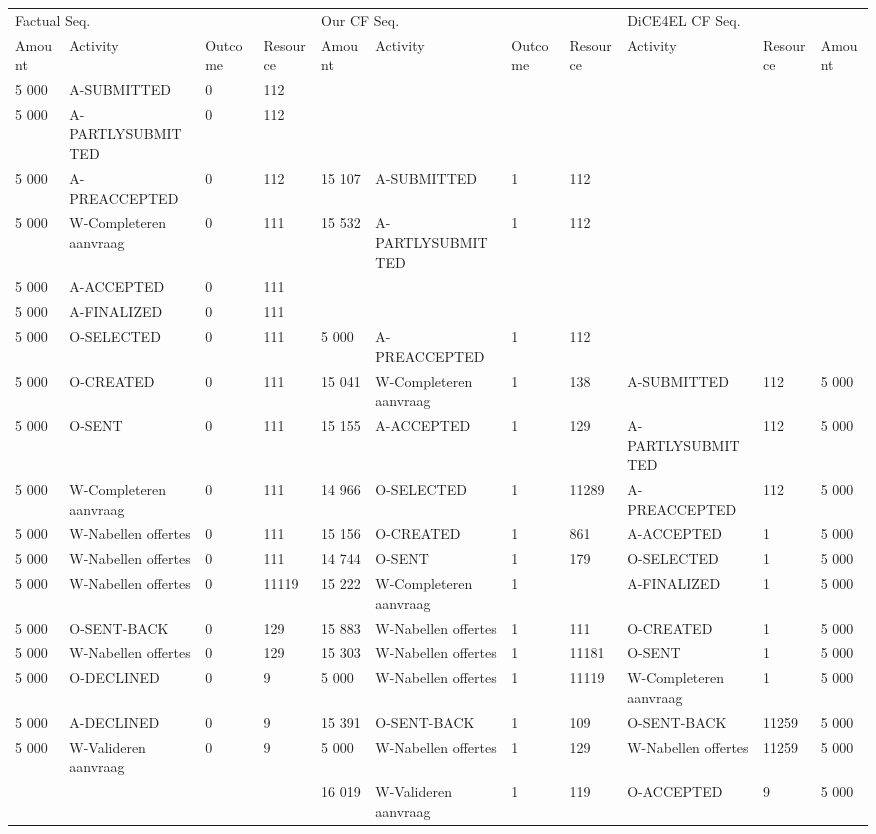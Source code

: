 \begin{tabular}{lllllllllll}
\toprule
\multicolumn{4}{l}{Factual Seq.} & \multicolumn{4}{l}{Our CF Seq.} & \multicolumn{3}{l}{DiCE4EL CF Seq.} \\
Amount & Activity & Outcome & Resource & Amount & Activity & Outcome & Resource & Activity & Resource & Amount \\
\midrule
5 000 & A-SUBMITTED & 0 & 112 &  &  &  &  &  &  &  \\
5 000 & A-PARTLYSUBMITTED & 0 & 112 &  &  &  &  &  &  &  \\
5 000 & A-PREACCEPTED & 0 & 112 & 15 107 & A-SUBMITTED & 1 & 112 &  &  &  \\
5 000 & W-Completeren aanvraag & 0 & 111 & 15 532 & A-PARTLYSUBMITTED & 1 & 112 &  &  &  \\
5 000 & A-ACCEPTED & 0 & 111 &  &  &  &  &  &  &  \\
5 000 & A-FINALIZED & 0 & 111 &  &  &  &  &  &  &  \\
5 000 & O-SELECTED & 0 & 111 & 5 000 & A-PREACCEPTED & 1 & 112 &  &  &  \\
5 000 & O-CREATED & 0 & 111 & 15 041 & W-Completeren aanvraag & 1 & 138 & A-SUBMITTED & 112 & 5 000 \\
5 000 & O-SENT & 0 & 111 & 15 155 & A-ACCEPTED & 1 & 129 & A-PARTLYSUBMITTED & 112 & 5 000 \\
5 000 & W-Completeren aanvraag & 0 & 111 & 14 966 & O-SELECTED & 1 & 11289 & A-PREACCEPTED & 112 & 5 000 \\
5 000 & W-Nabellen offertes & 0 & 111 & 15 156 & O-CREATED & 1 & 861 & A-ACCEPTED & 1 & 5 000 \\
5 000 & W-Nabellen offertes & 0 & 111 & 14 744 & O-SENT & 1 & 179 & O-SELECTED & 1 & 5 000 \\
5 000 & W-Nabellen offertes & 0 & 11119 & 15 222 & W-Completeren aanvraag & 1 &  & A-FINALIZED & 1 & 5 000 \\
5 000 & O-SENT-BACK & 0 & 129 & 15 883 & W-Nabellen offertes & 1 & 111 & O-CREATED & 1 & 5 000 \\
5 000 & W-Nabellen offertes & 0 & 129 & 15 303 & W-Nabellen offertes & 1 & 11181 & O-SENT & 1 & 5 000 \\
5 000 & O-DECLINED & 0 & 9 & 5 000 & W-Nabellen offertes & 1 & 11119 & W-Completeren aanvraag & 1 & 5 000 \\
5 000 & A-DECLINED & 0 & 9 & 15 391 & O-SENT-BACK & 1 & 109 & O-SENT-BACK & 11259 & 5 000 \\
5 000 & W-Valideren aanvraag & 0 & 9 & 5 000 & W-Nabellen offertes & 1 & 129 & W-Nabellen offertes & 11259 & 5 000 \\
 &  &  &  & 16 019 & W-Valideren aanvraag & 1 & 119 & O-ACCEPTED & 9 & 5 000 \\
\bottomrule
\end{tabular}
